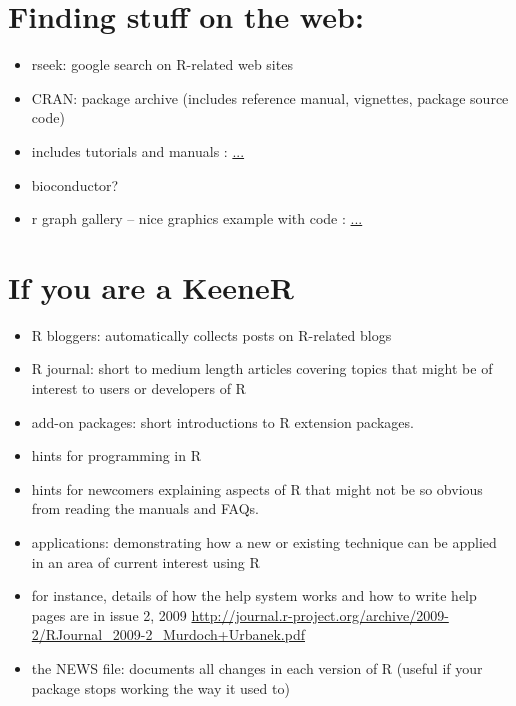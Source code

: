 \documentclass{article}
\begin{document}
\begin{multicols}{2}
\section{Finding stuff on the web:}
\begin{itemize}
\item rseek: google search on R-related web sites
\item CRAN: package archive (includes reference manual, vignettes, package source code)
\item includes tutorials and manuals : \url{...}
\item bioconductor?
\item r graph gallery -- nice graphics example with code : \url{...}
\end{itemize}


\section{If you are a KeeneR}
\begin{itemize}
\item R bloggers: automatically collects posts on R-related blogs
\item R journal: short to medium length articles covering topics that might be of interest to users or developers of R
\item add-on packages: short introductions to R extension packages.
\item hints for programming in R
\item hints for newcomers explaining aspects of R that might not be so obvious from reading the manuals and FAQs.
\item applications: demonstrating how a new or existing technique can be applied in an area of current interest using R
\item for instance, details of how the help system works and how to
  write help pages are in issue 2, 2009 \url{http://journal.r-project.org/archive/2009-2/RJournal_2009-2_Murdoch+Urbanek.pdf}

\item the NEWS file: documents all changes in each version of R
  (useful if your package stops working the way it used to)
\end{itemize}
  \end{multicols}
\end{document}
